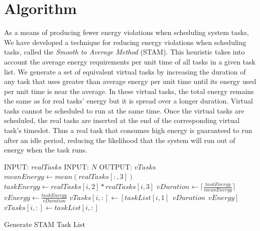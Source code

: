 
\section{Algorithm} \label{sec:algorithm}

As a means of producing fewer energy violations when scheduling system tasks, We have developed a technique for reducing energy violations when scheduling tasks, called the \emph{Smooth to Average Method} (\textsc{STAM}). This heuristic takes into account the average energy requirements per unit time of all tasks in a given task list. We generate a set of equivalent virtual tasks by increasing the duration of any task that uses greater than average energy per unit time until its energy used per unit time is near the average. In these virtual tasks, the total energy remains the same as for real tasks' energy but it is spread over a longer duration.  Virtual tasks cannot be scheduled to run at the same time.  Once the virtual tasks are scheduled, the real tasks are inserted at the end of the corresponding virtual task's timeslot.  Thus a real task that consumes high energy is guaranteed to run after an idle period, reducing the likelihood that the system will run out of energy when the task runs.

\begin{algorithm}[htb]
\label{stamalg}
\begin{algorithmic}
\STATE INPUT: $realTasks$  
\STATE INPUT: $N$ 
\STATE OUTPUT: $vTasks$ 
\STATE $meanEnergy \gets mean(realTasks[:,3])$
\STATE $taskEnergy \gets realTasks[i, 2] * realTasks[i,3]$
\STATE $vDuration \gets \lceil \frac{taskEnergy}{meanEnergy} \rceil$
\STATE $vEnergy \gets \frac{taskEnergy}{vDuration}$
\STATE $vTasks[i,:] \gets [taskList[i,1]~~vDuration~~vEnergy]$
\ELSE
\STATE $vTasks[i,:] \gets taskList[i,:]$
\ENDIF
\ENDFOR
\end{algorithmic}
\caption{Generate \textsc{STAM} Task List}
\end{algorithm}

